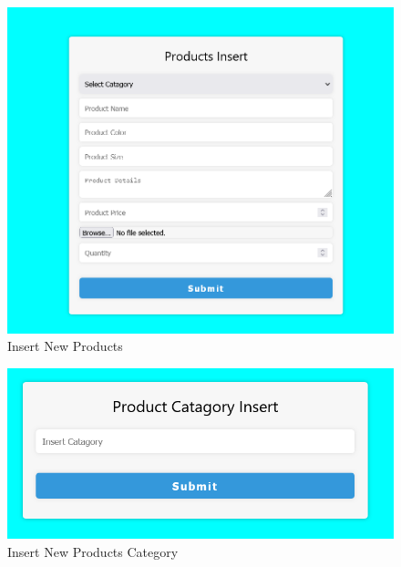 \newpage
\begin{figure}[ht]
\vspace{5cm}
    \centering  
    \includegraphics[width=\textwidth, height=0.8\textheight, keepaspectratio]{designs/product insert.png}    
    \caption{Insert New Products}
    \label{fig:fig 6.2.24}
\end{figure}
\begin{figure}[ht]
    \centering  
    \includegraphics[width=\textwidth, height=0.8\textheight, keepaspectratio]{designs/product catagory insert.png}    
    \caption{Insert New Products Category}
    \label{fig:fig 6.2.25}
\end{figure}
